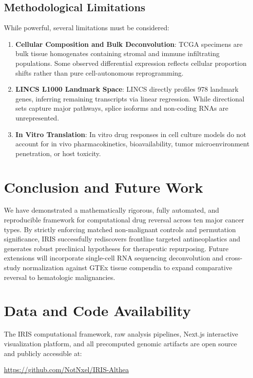 \documentclass[10pt,journal,compsoc,twocolumn]{IEEEtran}
\begin{document}
\subsection{Methodological Limitations}
While powerful, several limitations must be considered:
\begin{enumerate}
    \item \textbf{Cellular Composition and Bulk Deconvolution}: TCGA specimens are bulk tissue homogenates containing stromal and immune infiltrating populations. Some observed differential expression reflects cellular proportion shifts rather than pure cell-autonomous reprogramming.
    \item \textbf{LINCS L1000 Landmark Space}: LINCS directly profiles 978 landmark genes, inferring remaining transcripts via linear regression. While directional sets capture major pathways, splice isoforms and non-coding RNAs are unrepresented.
    \item \textbf{In Vitro Translation}: In vitro drug responses in cell culture models do not account for in vivo pharmacokinetics, bioavailability, tumor microenvironment penetration, or host toxicity.
\end{enumerate}

\section{Conclusion and Future Work}
We have demonstrated a mathematically rigorous, fully automated, and reproducible framework for computational drug reversal across ten major cancer types. By strictly enforcing matched non-malignant controls and permutation significance, IRIS successfully rediscovers frontline targeted antineoplastics and generates robust preclinical hypotheses for therapeutic repurposing. Future extensions will incorporate single-cell RNA sequencing deconvolution and cross-study normalization against GTEx tissue compendia to expand comparative reversal to hematologic malignancies.

\section*{Data and Code Availability}
The IRIS computational framework, raw analysis pipelines, Next.js interactive visualization platform, and all precomputed genomic artifacts are open source and publicly accessible at:
\begin{center}
\url{https://github.com/NotNxel/IRIS-Althea}
\end{center}
\end{document}
